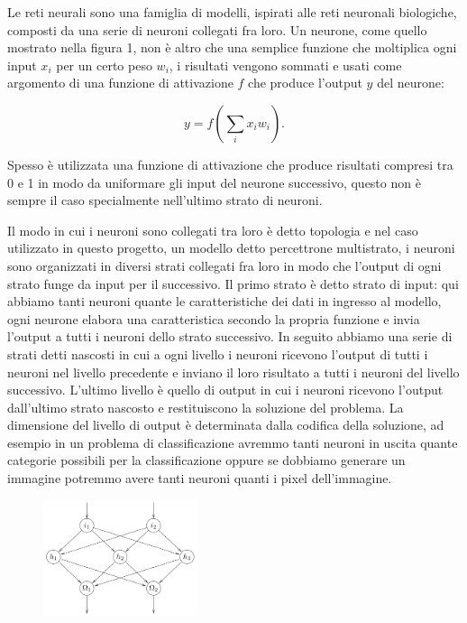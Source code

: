 \documentclass[a4paper,12pt]{report}
\begin{document}
Le reti neurali sono una famiglia di modelli, ispirati alle reti neuronali
biologiche, composti da una serie di neuroni collegati fra loro. Un
neurone, come quello mostrato nella figura 1, non è altro che una semplice
funzione che moltiplica ogni input $x_i$ per un certo peso $w_i$, i risultati
vengono sommati e usati come argomento di una funzione di attivazione $f$ che
produce l'output $y$ del neurone:

$$
y = f\left(\sum_i x_i w_i\right).
$$

Spesso è utilizzata una funzione di attivazione che produce risultati compresi
tra 0 e 1 in modo da uniformare gli input del neurone successivo, questo non è
sempre il caso specialmente nell'ultimo strato di neuroni.

Il modo in cui i neuroni sono collegati tra loro è detto topologia e nel caso
utilizzato in questo progetto, un modello detto percettrone multistrato, i
neuroni sono organizzati in diversi strati collegati fra loro in modo che
l'output di ogni strato funge da input per il successivo. Il primo strato è
detto strato di input: qui abbiamo tanti neuroni quante le caratteristiche
dei dati in ingresso al modello, ogni neurone elabora una caratteristica secondo
la propria funzione e invia l'output a tutti i neuroni dello strato successivo. In
seguito abbiamo una serie di strati detti nascosti in cui a ogni livello i
neuroni ricevono l'output di tutti i neuroni nel livello precedente e inviano il
loro risultato a tutti i neuroni del livello successivo. L'ultimo livello è
quello di output in cui i neuroni ricevono l'output dall'ultimo strato nascosto e
restituiscono la soluzione del problema. La dimensione del livello di output è determinata
dalla codifica della soluzione, ad esempio in un problema di classificazione
avremmo tanti neuroni in uscita quante categorie possibili per la
classificazione oppure se dobbiamo generare un immagine potremmo avere tanti
neuroni quanti i pixel dell'immagine.

\begin{figure}
	\centering
	\includegraphics[width = 0.4\textwidth]{Immagini/MLP diagramma.png}
\end{figure}
\end{document}
